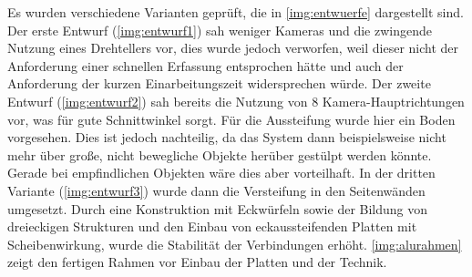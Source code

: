 \documentclass[./00PhotoBox.tex]{subfiles}
\begin{document}
Es wurden verschiedene Varianten geprüft, die in \autoref{img:entwuerfe} dargestellt sind. Der erste Entwurf (\autoref{img:entwurf1}) sah weniger Kameras und die zwingende Nutzung eines Drehtellers vor, dies wurde jedoch verworfen, weil dieser nicht der Anforderung einer schnellen Erfassung entsprochen hätte und auch der Anforderung der kurzen Einarbeitungszeit widersprechen würde. Der zweite Entwurf (\autoref{img:entwurf2}) sah bereits die Nutzung von 8 Kamera-Hauptrichtungen vor, was für gute Schnittwinkel sorgt. Für die Aussteifung wurde hier ein Boden vorgesehen. Dies ist jedoch nachteilig, da das System dann beispielsweise nicht mehr über große, nicht bewegliche Objekte herüber gestülpt werden könnte. Gerade bei empfindlichen Objekten wäre dies aber vorteilhaft. In der dritten Variante (\autoref{img:entwurf3}) wurde dann die Versteifung in den Seitenwänden umgesetzt. Durch eine Konstruktion mit Eckwürfeln sowie der Bildung von dreieckigen Strukturen und den Einbau von eckaussteifenden Platten mit Scheibenwirkung, wurde die Stabilität der Verbindungen erhöht. \autoref{img:alurahmen} zeigt den fertigen Rahmen vor Einbau der Platten und der Technik.
\end{document}
